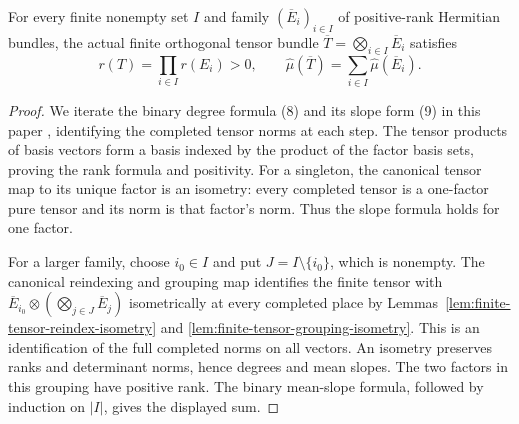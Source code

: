 \begin{lemma}
\label{lem:finite-tensor-mean-slope}
\leanok
For every finite nonempty set $I$ and family
$(\overline E_i)_{i\in I}$ of positive-rank Hermitian bundles, the actual
finite orthogonal tensor bundle $\overline T=\bigotimes_{i\in I}\overline E_i$
satisfies
\[
 r(T)=\prod_{i\in I}r(E_i)>0,\qquad
 \widehat\mu(\overline T)=\sum_{i\in I}\widehat\mu(\overline E_i).
\]
\end{lemma}
\begin{proof}
We iterate the binary degree formula (8) and its slope form (9) in this
paper \cite{bost2026}, identifying the completed tensor norms at each step.
The tensor products of basis vectors form a basis indexed by the product
of the factor basis sets, proving the rank formula and positivity.
For a singleton, the canonical tensor map to its unique factor is an
isometry: every completed tensor is a one-factor pure tensor and its norm
is that factor's norm. Thus the slope formula holds for one factor.

For a larger family, choose $i_0\in I$ and put $J=I\setminus\{i_0\}$,
which is nonempty. The canonical reindexing and grouping map identifies
the finite tensor with
$\overline E_{i_0}\otimes(\bigotimes_{j\in J}\overline E_j)$ isometrically
at every completed place by
Lemmas~\ref{lem:finite-tensor-reindex-isometry} and
\ref{lem:finite-tensor-grouping-isometry}.
This is an identification of the full completed norms on all vectors.
An isometry preserves ranks and determinant norms, hence degrees and mean
slopes. The two factors in this grouping have positive rank. The binary
mean-slope formula, followed by induction on $|I|$, gives the displayed sum.
\end{proof}


